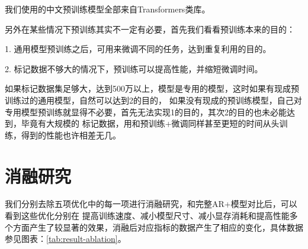 \documentclass[letterpaper]{article} %
\DeclareRobustCommand{\citeext}[1]{\cite[#1]{#1}}
\begin{document}
\begin{CJK*}{UTF8}{gbsn}
我们使用的中文预训练模型全部来自Transformers类库\citeext{Wolf2019HuggingFacesTS}。

另外在某些情况下预训练其实不一定有必要，首先我们看看预训练本来的目的：

1. 通用模型预训练之后，可用来微调不同的任务，达到重复利用的目的。

2. 标记数据不够大的情况下，预训练可以提高性能，并缩短微调时间。

如果标记数据集足够大，达到500万以上，模型是专用的模型，这时如果有现成预训练过的通用模型，自然可以达到2的目的，
如果没有现成的预训练模型，自己对专用模型预训练就显得不必要，首先无法实现1的目的，其次2的目的也未必能达到，毕竟有大规模的
标记数据，用和预训练+微调同样甚至更短的时间从头训练，得到的性能也许相差无几。


\section[Ablation Study]{消融研究} 
我们分别去除五项优化中的每一项进行消融研究，和完整AR+模型对比后，可以看到这些优化分别在%
提高训练速度、减小模型尺寸、减小显存消耗和提高性能多个方面产生了较显著的效果，消融后对应指标的数据产生了相应的变化，具体数据参见图表：\ref{tab:result-ablation}。
 
\begin{table*} [b]
\centering
\caption{消融研究结果，加粗的数据为退化指标}
\label{tab:result-ablation}
\end{table*}
                     


\end{CJK*}
\end{document}
